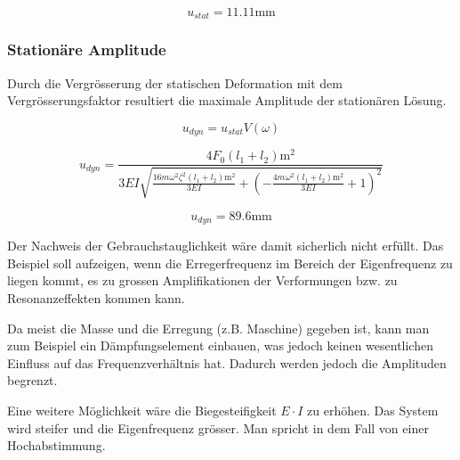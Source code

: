 \documentclass[
  letterpaper,
  DIV=11]{scrreprt}
\begin{document}
\begin{equation}u_{stat} = 11.11 \text{mm}\end{equation}

\hypertarget{stationuxe4re-amplitude}{%
\subsubsection{Stationäre Amplitude}\label{stationuxe4re-amplitude}}

Durch die Vergrösserung der statischen Deformation mit dem
Vergrösserungsfaktor resultiert die maximale Amplitude der stationären
Lösung.

\begin{equation}u_{dyn} = u_{stat} V{\left(\omega \right)}\end{equation}

\begin{equation}u_{dyn} = \frac{4 F_{0} \left(l_{1} + l_{2}\right) \text{m}^{2}}{3 EI \sqrt{\frac{16 m_{} \omega^{2} \zeta^{2} \left(l_{1} + l_{2}\right) \text{m}^{2}}{3 EI} + \left(- \frac{4 m_{} \omega^{2} \left(l_{1} + l_{2}\right) \text{m}^{2}}{3 EI} + 1\right)^{2}}}\end{equation}

\begin{equation}u_{dyn} = 89.6 \text{mm}\end{equation}

Der Nachweis der Gebrauchstauglichkeit wäre damit sicherlich nicht
erfüllt. Das Beispiel soll aufzeigen, wenn die Erregerfrequenz im
Bereich der Eigenfrequenz zu liegen kommt, es zu grossen Amplifikationen
der Verformungen bzw. zu Resonanzeffekten kommen kann.

Da meist die Masse und die Erregung (z.B. Maschine) gegeben ist, kann
man zum Beispiel ein Dämpfungselement einbauen, was jedoch keinen
wesentlichen Einfluss auf das Frequenzverhältnis hat. Dadurch werden
jedoch die Amplituden begrenzt.

Eine weitere Möglichkeit wäre die Biegesteifigkeit \(E\cdot I\) zu
erhöhen. Das System wird steifer und die Eigenfrequenz grösser. Man
spricht in dem Fall von einer Hochabstimmung.
\end{document}
